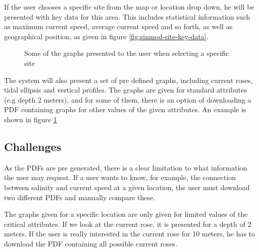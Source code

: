 \documentclass[11pt,a4paper,titlepage,oneside]{report}
\begin{document}
If the user chooses a specific site from the map or location drop down, he will be presented with key data for this area. This includes statistical information such as maximum current speed, average current speed and so forth, as well as geographical position, as given in figure \ref{fig:sinmod-site-key-data}.


\begin{figure}[h]
\begin{center}
\caption{Some of the graphs presented to the user when selecting a specific site}
\label{fig:sinmod-site-graphs}
\end{center}
\end{figure}

The system will also present a set of pre defined graphs, including current roses, tidal ellipsis and vertical profiles. The graphs are given for standard attributes (e.g depth 2 meters), and for some of them, there is an option of downloading a PDF containing graphs for other values of the given attributes. An example is shown in figure \ref{fig:sinmod-site-graphs}


\subsection{Challenges}
As the PDFs are pre generated, there is a clear limitation to what information the user may request. If a user wants to know, for example, the connection between salinity and current speed at a given location, the user must download two different PDFs and manually compare these. 

The graphs given for a specific location are only given for limited values of the critical attributes. If we look at the current rose, it is presented for a depth of 2 meters. If the user is really interested in the current rose for 10 meters, he has to download the PDF containing all possible current roses. 
\end{document}
